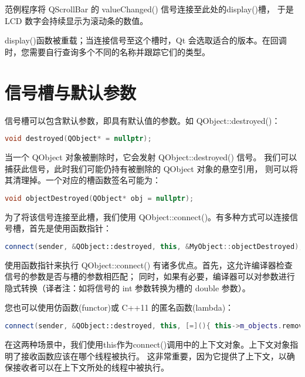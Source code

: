 范例程序将 QScrollBar 的 valueChanged() 信号连接至此处的display()槽，
于是 LCD 数字会持续显示为滚动条的数值。

\begin{notice}
display()函数被重载；当连接信号至这个槽时，Qt 会选取适合的版本。在回调时，您需要自行查询多个不同的名称并跟踪它们的类型。
\end{notice}

\section{信号槽与默认参数}

信号槽可以包含默认参数，即具有默认值的参数。如 QObject::destroyed()：

\begin{lstlisting}[language=C++]
void destroyed(QObject* = nullptr);
\end{lstlisting}

当一个 QObject 对象被删除时，它会发射 QObject::destroyed() 信号。
我们可以捕获此信号，此时我们可能仍持有被删除的 QObject 对象的悬空引用，
则可以将其清理掉。一个对应的槽函数签名可能为：

\begin{lstlisting}[language=C++]
void objectDestroyed(QObject* obj = nullptr);
\end{lstlisting}

为了将该信号连接至此槽，我们使用 QObject::connect()。有多种方式可以连接信号槽，首先是使用函数指针：

\begin{lstlisting}[language=C++]
connect(sender, &QObject::destroyed, this, &MyObject::objectDestroyed);   
\end{lstlisting}

使用函数指针来执行 QObject::connect() 有诸多优点。首先，这允许编译器检查信号的参数是否与槽的参数相匹配；
同时，如果有必要，编译器可以对参数进行隐式转换（译者注：如将信号的 int 参数转换为槽的 double 参数）。

您也可以使用仿函数(functor)或 C++11 的匿名函数(lambda)：

\begin{lstlisting}[language=C++]
connect(sender, &QObject::destroyed, this, [=](){ this->m_objects.remove(sender); });
\end{lstlisting}

在这两种场景中，我们使用this作为connect()调用中的上下文对象。上下文对象指明了接收函数应该在哪个线程被执行。
这非常重要，因为它提供了上下文，以确保接收者可以在上下文所处的线程中被执行。

